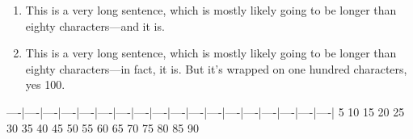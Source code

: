 \begin{enumerate}
  \item This is a very long sentence, which is mostly likely going to be longer
        than eighty characters---and it is.
  \item This is a very long sentence, which is mostly likely going to be longer
        than eighty characters---in fact, it is. But it's wrapped on one
        hundred characters, yes 100.
\end{enumerate}
----|----|----|----|----|----|----|----|----|----|----|----|----|----|----|----|----|----|
   5   10   15   20   25   30   35   40   45   50   55   60   65   70   75   80   85   90